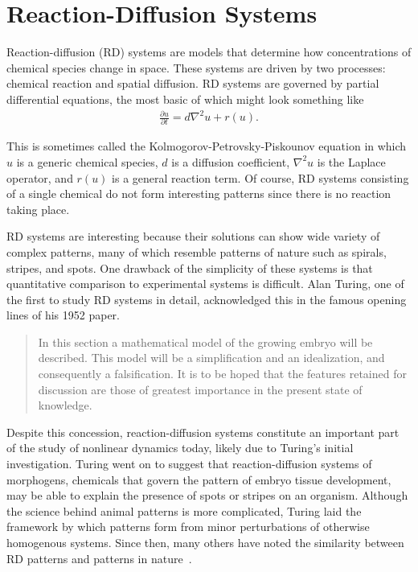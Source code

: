 \chapter{Reaction-Diffusion Systems}

	Reaction-diffusion (RD) systems are models that determine how concentrations of chemical species change in space. These systems are driven by two processes: chemical reaction and spatial diffusion. RD systems are governed by partial differential equations, the most basic of which might look something like
	\begin{align}
		\frac{\partial u}{\partial t} = d \nabla^2 u + r(u).
		\label{eq:KPP}
	\end{align}

This is sometimes called the Kolmogorov-Petrovsky-Piskounov equation in which $u$ is a generic chemical species, $d$ is a diffusion coefficient, $\nabla^2 u$ is the Laplace operator, and $r(u)$ is a general reaction term. Of course, RD systems consisting of a single chemical do not form interesting patterns since there is no reaction taking place.

	RD systems are interesting because their solutions can show wide variety of complex patterns, many of which resemble patterns of nature such as spirals, stripes, and spots. One drawback of the simplicity of these systems is that quantitative comparison to experimental systems is difficult. Alan Turing, one of the first to study RD systems in detail, acknowledged this in the famous opening lines of his 1952 paper.
%
\begin{quote}
In this section a mathematical model of the growing embryo will be described. This model will be a simplification and an idealization, and consequently a falsification. It is to be hoped that the features retained for discussion are those of greatest importance in the present state of knowledge.
\end{quote}
%
	Despite this concession, reaction-diffusion systems constitute an important part of the study of nonlinear dynamics today, likely due to Turing's initial investigation. Turing went on to suggest that reaction-diffusion systems of morphogens, chemicals that govern the pattern of embryo tissue development, may be able to explain the presence of spots or stripes on an organism. Although the science behind animal patterns is more complicated, Turing laid the framework by which patterns form from minor perturbations of otherwise homogenous systems. Since then, many others have noted the similarity between RD patterns and patterns in nature~.

